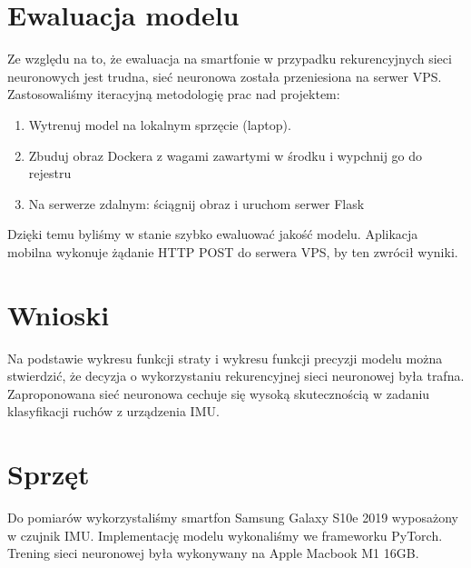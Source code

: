 \documentclass[10pt]{article}
\begin{document}
\section{Ewaluacja modelu}

Ze względu na to, że ewaluacja na smartfonie w przypadku rekurencyjnych sieci neuronowych jest trudna, sieć neuronowa została przeniesiona na serwer VPS. Zastosowaliśmy iteracyjną metodologię prac nad projektem: 

\begin{enumerate}
  \item Wytrenuj model na lokalnym sprzęcie (laptop).
  \item Zbuduj obraz Dockera z wagami zawartymi w środku i wypchnij go do rejestru
  \item Na serwerze zdalnym: ściągnij obraz i uruchom serwer Flask
\end{enumerate}

Dzięki temu byliśmy w stanie szybko ewaluować jakość modelu. Aplikacja mobilna wykonuje żądanie HTTP POST do serwera VPS, by ten zwrócił wyniki.

\section{Wnioski}

Na podstawie wykresu funkcji straty i wykresu funkcji precyzji modelu można stwierdzić, że decyzja o wykorzystaniu rekurencyjnej sieci neuronowej była trafna. Zaproponowana sieć neuronowa cechuje się wysoką skutecznością w zadaniu klasyfikacji ruchów z urządzenia IMU.

\section{Sprzęt}

Do pomiarów wykorzystaliśmy smartfon Samsung Galaxy S10e 2019 wyposażony w czujnik IMU. Implementację modelu wykonaliśmy we frameworku PyTorch. Trening sieci neuronowej była wykonywany na Apple Macbook M1 16GB.



\end{document}
